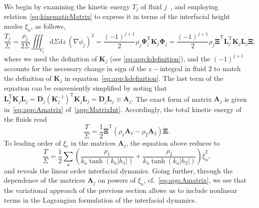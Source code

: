 \documentclass[a4paper]{jpconf}
\newcommand{\dd}{\mathrm{d}}
\begin{document}
We begin by examining the kinetic energy $T_j$ of fluid $j$~\cite{Landau2013Fluid6}, and employing relation~\eqref{eq:kinematicMatrix} to express it in terms of the interfacial height modes $\xi_a$, as follows,
\begin{equation}
    \label{eq:kineticEnergy}
    \frac{T_j}{\Sigma} = \frac{\rho_j}{2\Sigma}\iiint_{V_j}\dd\Sigma\dd z~\left(\nabla\phi_j\right)^2
    =\frac{(-1)^{j+1}}{2}\rho_j\bm{\Phi}_j^\mathrm{T}\mathbf{K}_j\bm{\Phi}_j
    =\frac{(-1)^{j+1}}{2}\rho_j\bm{\dot{\Xi}}^\mathrm{T}\mathbf{L}_j^\mathrm{T}\mathbf{K}_j\mathbf{L}_j\bm{\dot{\Xi}},
\end{equation}
where we used the definition of $\mathbf{K}_j$ (see \eqref{eq:app:kdefinition}), and the $(-1)^{j+1}$ accounts for the necessary change in sign of the $z-$integral in fluid $2$ to match the definition of $\mathbf{K}_j$ in equation~\eqref{eq:app:kdefinition}. The last term of the equation can be conveniently simplified by noting that $\mathbf{L}_j^\mathrm{T}\mathbf{K}_j\mathbf{L}_j=\mathbf{D}_j(\mathbf{K}_j^{-1})^\mathrm{T}\mathbf{K}_j\mathbf{L}_j=\mathbf{D}_j\mathbf{L}_j\equiv\mathbf{A}_j$. The exact form of matrix $\mathbf{A}_j$ is given in~\eqref{eq:app:Amatrix} of~\ref{app:MatrixInt}. Accordingly, the total kinetic energy of the fluids read
\begin{equation}
\label{eq:totKineticEn}
    \frac{T}{\Sigma} = \frac{1}{2}\bm{\dot{\Xi}}^\mathrm{T}\left(\rho_1\mathbf{A}_1-\rho_2\mathbf{A}_2\right)\bm{\dot{\Xi}}.
\end{equation}
To leading order of $\xi_c$ in the matrices $\mathbf{A}_j$, the equation above reduces to 
\begin{equation}
    \frac{T}{\Sigma} = \frac{1}{2}\sum_{a} \left(\frac{\rho_1}{k_a\tanh(k_a|h_1|)}+\frac{\rho_2}{k_a\tanh(k_a|h_2|)}\right)\dot{\xi}_a^2,
\end{equation}
and reveals the linear order interfacial dynamics. Going further, through the dependence of the matrices $\mathbf{A}_j$ on powers of $\xi_a$, cf.~\eqref{eq:app:Amatrix}, we see that the variational approach of the previous section allows us to include nonlinear terms in the Lagrangian formulation of the interfacial dynamics.
\end{document}
